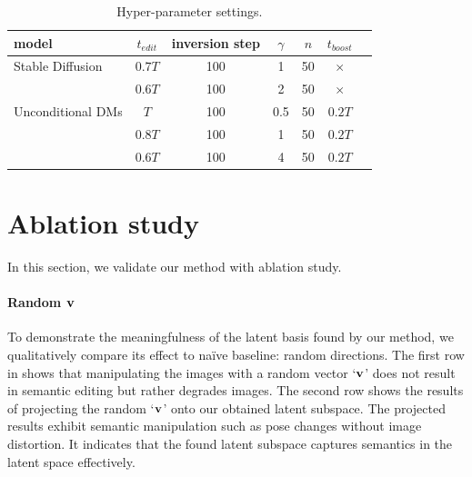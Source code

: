 \begin{table}[t]
\caption{Hyper-parameter settings.}
\label{tab:setting}
\begin{center}
\begin{small}
\begin{tabular}{lcccccc}
\toprule
model & $t_{edit}$ & inversion step & $\gamma$ & $n$ & $t_{boost}$ \\
\midrule
Stable Diffusion    & $0.7T$ & 100 & 1     & 50 & $\times$  \\
                    & $0.6T$ & 100 & 2     & 50 & $\times$  \\
Unconditional DMs   & $T$    & 100 & 0.5   & 50 & $0.2T$    \\
                    & $0.8T$ & 100 & 1     & 50 & $0.2T$    \\
                    & $0.6T$ & 100 & 4     & 50 & $0.2T$    \\
\bottomrule
\end{tabular}
\end{small}
\end{center}
\vskip -0.1in
\end{table}
\label{tab:hyperparameter}
\section{Ablation study}

In this section, we validate our method with ablation study. 

\paragraph{Random $\mathbf{v}$} 
To demonstrate the meaningfulness of the latent basis found by our method, we qualitatively compare its effect to na\"ive baseline: random directions.
The first row in  shows that manipulating the images with a random vector `$\mathbf{v}$' does not result in semantic editing but rather degrades images.
The second row shows the results of projecting the random `$\mathbf{v}$' onto our obtained latent subspace. The projected results exhibit semantic manipulation such as pose changes without image distortion.
It indicates that the found latent subspace captures semantics in the latent space effectively.


